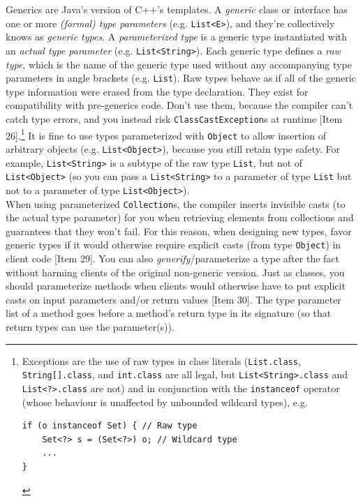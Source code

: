 \documentclass[table, xcdraw]{article}%
\begin{document}
Generics are Java's version of C++'s templates. A \emph{generic} class or interface has one or more \emph{(formal) type parameters} (e.g. \texttt{List<E>}), and they're collectively knows as \emph{generic types}. A \emph{parameterized type} is a generic type instantiated with an \emph{actual type parameter} (e.g. \texttt{List<String>}). Each generic type defines a \emph{raw type}, which is the name of the generic type used without any accompanying type parameters in angle brackets (e.g. \texttt{List}). Raw types behave as if all of the generic type information were erased from the type declaration. They exist for compatibility with pre-generics code. Don't use them, because the compiler can't catch type errors, and you instead risk \texttt{ClassCastException}s at runtime [Item 26].\footnote{Exceptions are the use of raw types in class literals (\texttt{List.class}, \texttt{String[].class}, and \texttt{int.class} are all legal, but \texttt{List<String>.class} and \texttt{List<?>.class} are not) and in conjunction with the \texttt{instanceof} operator (whose behaviour is unaffected by unbounded wildcard types), e.g.
\begin{verbatim}
if (o instanceof Set) { // Raw type
    Set<?> s = (Set<?>) o; // Wildcard type
    ...
}
\end{verbatim}
}
It is fine to use types parameterized with \texttt{Object} to allow insertion of arbitrary objects (e.g. \texttt{List<Object>}), because you still retain type safety. For example, \texttt{List<String>} is a subtype of the raw type \texttt{List}, but not of \texttt{List<Object>} (so you can pass a \texttt{List<String>} to a parameter of type \texttt{List} but not to a parameter of type \texttt{List<Object>}).\\
When using parameterized \texttt{Collection}s, the compiler inserts invisible casts (to the actual type parameter) for you when retrieving elements from collections and guarantees that they won't fail. For this reason, when designing new types, favor generic types if it would otherwise require explicit casts (from type \texttt{Object}) in client code [Item 29]. You can also \emph{generify}/parameterize a type after the fact without harming clients of the original non-generic version. Just as classes, you should parameterize methods when clients would otherwise have to put explicit casts on input parameters and/or return values [Item 30]. The type parameter list of a method goes before a method's return type in its signature (so that return types can use the parameter(s)).
\end{document}
